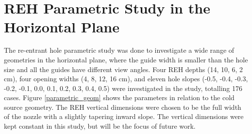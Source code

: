 \documentclass[a4paper]{jpconf}
\begin{document}
\section{REH Parametric Study in the Horizontal Plane}

The re-entrant hole parametric study was done to investigate a wide range of geometries in the horizontal plane, where the guide width is smaller than the hole size and all the guides have different view angles.  Four REH depths (14, 10, 6, 2 cm), four opening widths (4, 8, 12, 16 cm), and eleven hole slopes (-0.5, -0.4, -0.3, -0.2, -0.1, 0.0, 0.1, 0.2, 0.3, 0.4, 0.5) were investigated in the study, totalling 176 cases. Figure \ref{parametric_geom} shows the parameters in relation to the cold source geometry.  The REH vertical dimensions were chosen to be the full width of the nozzle with a slightly tapering inward slope.  The vertical dimensions were kept constant in this study, but will be the focus of future work.
\end{document}
